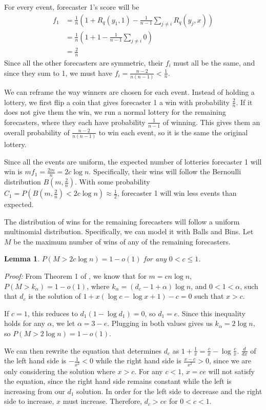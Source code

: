 \documentclass[letterpaper,12pt]{article}
\newcommand{\1}{\mathbbm{1}}
\newtheorem{lemma}[theorem]{Lemma}
\begin{document}
For every event, forecaster 1's score will be 
\begin{align*}
  f_1 &= \frac{1}{n}\left(1 + R_q(y_1, 1) - \frac{1}{n-1} \sum_{j \neq i} R_q(y_j, x) \right) \\
      &= \frac{1}{n}\left(1 + 1 - \frac{1}{n-1} \sum_{j \neq i} 0 \right)\\
      &= \frac{2}{n}
\end{align*}
Since all the other forecasters are symmetric, their $f_i$ must all be the same, and since they sum to 1, we must have $f_i = \frac{n-2}{n(n-1)} < \frac{1}{n}$. 

We can reframe the way winners are chosen for each event. Instead of holding a lottery, we first flip a coin that gives forecaster 1 a win with probability $\frac{2}{n}$. If it does not give them the win, we run a normal lottery for the remaining forecasters, where they each have probability $\frac{1}{n-1}$ of winning. This gives them an overall probability of $\frac{n-2}{n(n-1)}$ to win each event, so it is the same the original lottery. 

Since all the events are uniform, the expected number of lotteries forecaster 1 will win is $m f_1 = \frac{2m}{n} = 2 c \log n$. Specifically, their wins will follow the Bernoulli distribution $B(m, \frac{2}{n})$. With some probability $C_1 = P(B(m, \frac{2}{n}) < 2 c \log n) \approx \frac{1}{2}$, forecaster 1 will win less events than expected. 

The distribution of wins for the remaining forecasters will follow a uniform multinomial distribution. Specifically, we can model it with Balls and Bins. Let $M$ be the maximum number of wins of any of the remaining forecasters. 
\begin{lemma}
    $P(M > 2 c \log n) = 1 - o(1)$ for any $0 < c \leq 1$.
\end{lemma}
\emph{Proof:}
From Theorem 1 of \citet{raab1998balls}, we know that for $m = c n \log n$, $P(M > k_\alpha) = 1 - o(1)$, where $k_\alpha = (d_c - 1 + \alpha) \log n$, and $0 < 1 < \alpha$, such that $d_c$ is the solution of $1 + x(\log c - \log x + 1) - c= 0$ such that $x > c$.

If $c = 1$, this reduces to $d_1 (1 - \log d_1) = 0$, so $d_1 = e$. Since this inequality holds for any $\alpha$, we let $\alpha = 3 - e$. Plugging in both values gives us $k_\alpha = 2 \log n$, so $P(M > 2 \log n) = 1 - o(1)$.

We can then rewrite the equation that determines $d_c$ as $1 + \frac{1}{x} = \frac{c}{x} - \log \frac{c}{x} $. $\frac{d}{dx}$ of the left hand side is $-\frac{1}{x^2} < 0$ while the right hand side is $\frac{x-c}{x^2} > 0$, since we are only considering the solution where $x > c$. For any $c < 1$, $x = ce$ will not satisfy the equation, since the right hand side remains constant while the left is increasing from our $d_1$ solution. In order for the left side to decrease and the right side to increase, $x$ must increase. Therefore, $d_c > ce$ for $0 < c < 1$. 
\end{document}
